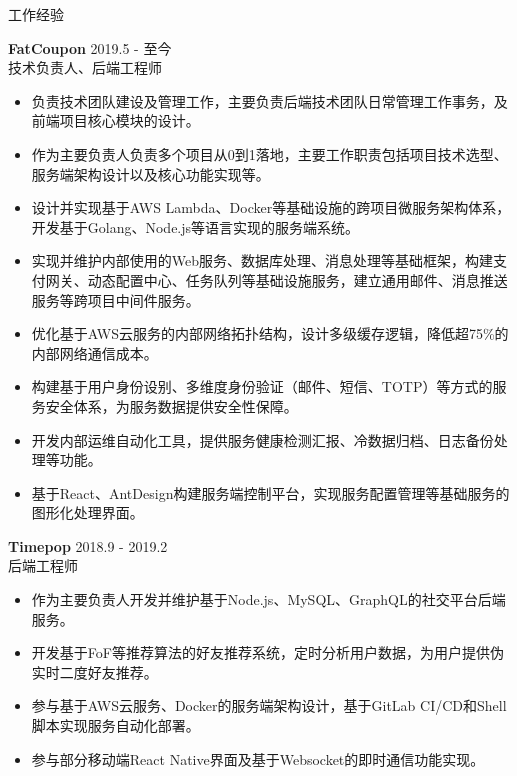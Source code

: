 \documentclass{resume} %
\begin{document}
\begin{rSection}{工作经验}

\textbf{FatCoupon} \hfill 2019.5 - 至今\\
技术负责人、后端工程师 \hfill \textit{}
\begin{itemize}
  \itemsep -3pt {}
  \item 负责技术团队建设及管理工作，主要负责后端技术团队日常管理工作事务，及前端项目核心模块的设计。
  \item 作为主要负责人负责多个项目从0到1落地，主要工作职责包括项目技术选型、服务端架构设计以及核心功能实现等。
  \item 设计并实现基于AWS Lambda、Docker等基础设施的跨项目微服务架构体系，开发基于Golang、Node.js等语言实现的服务端系统。
  \item 实现并维护内部使用的Web服务、数据库处理、消息处理等基础框架，构建支付网关、动态配置中心、任务队列等基础设施服务，建立通用邮件、消息推送服务等跨项目中间件服务。
  \item 优化基于AWS云服务的内部网络拓扑结构，设计多级缓存逻辑，降低超75\%的内部网络通信成本。
  \item 构建基于用户身份设别、多维度身份验证（邮件、短信、TOTP）等方式的服务安全体系，为服务数据提供安全性保障。
  \item 开发内部运维自动化工具，提供服务健康检测汇报、冷数据归档、日志备份处理等功能。
  \item 基于React、AntDesign构建服务端控制平台，实现服务配置管理等基础服务的图形化处理界面。
\end{itemize}

\textbf{Timepop} \hfill 2018.9 - 2019.2\\
后端工程师 \hfill \textit{}
\begin{itemize}
  \itemsep -3pt {}
  \item 作为主要负责人开发并维护基于Node.js、MySQL、GraphQL的社交平台后端服务。
  \item 开发基于FoF等推荐算法的好友推荐系统，定时分析用户数据，为用户提供伪实时二度好友推荐。
  \item 参与基于AWS云服务、Docker的服务端架构设计，基于GitLab CI/CD和Shell脚本实现服务自动化部署。
  \item 参与部分移动端React Native界面及基于Websocket的即时通信功能实现。
\end{itemize}


\end{rSection}
\end{document}
